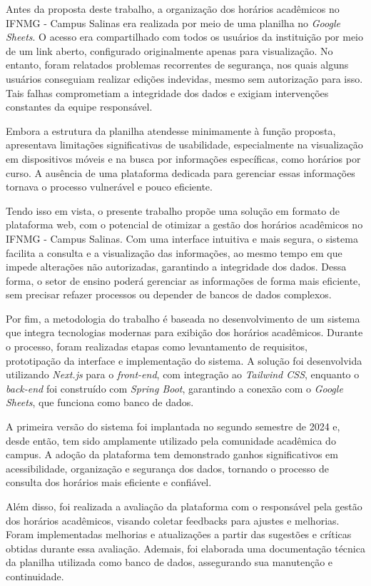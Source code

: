 Antes da proposta deste trabalho, a organização dos horários acadêmicos no IFNMG - Campus Salinas era realizada por meio de uma planilha no \textit{Google Sheets}. O acesso era compartilhado com todos os usuários da instituição por meio de um link aberto, configurado originalmente apenas para visualização. No entanto, foram relatados problemas recorrentes de segurança, nos quais alguns usuários conseguiam realizar edições indevidas, mesmo sem autorização para isso. Tais falhas comprometiam a integridade dos dados e exigiam intervenções constantes da equipe responsável.

Embora a estrutura da planilha atendesse minimamente à função proposta, apresentava limitações significativas de usabilidade, especialmente na visualização em dispositivos móveis e na busca por informações específicas, como horários por curso. A ausência de uma plataforma dedicada para gerenciar essas informações tornava o processo vulnerável e pouco eficiente.

Tendo isso em vista, o presente trabalho propõe uma solução em formato de plataforma web, com o potencial de otimizar a gestão dos horários acadêmicos no IFNMG - Campus Salinas. Com uma interface intuitiva e mais segura, o sistema facilita a consulta e a visualização das informações, ao mesmo tempo em que impede alterações não autorizadas, garantindo a integridade dos dados. Dessa forma, o setor de ensino poderá gerenciar as informações de forma mais eficiente, sem precisar refazer processos ou depender de bancos de dados complexos.

Por fim, a metodologia do trabalho é baseada no desenvolvimento de um sistema que integra tecnologias modernas para exibição dos horários acadêmicos. Durante o processo, foram realizadas etapas como levantamento de requisitos, prototipação da interface e implementação do sistema. A solução foi desenvolvida utilizando \textit{Next.js} para o \textit{front-end}, com integração ao \textit{Tailwind CSS}, enquanto o \textit{back-end} foi construído com \textit{Spring Boot}, garantindo a conexão com o \textit{Google Sheets}, que funciona como banco de dados.

A primeira versão do sistema foi implantada no segundo semestre de 2024 e, desde então, tem sido amplamente utilizado pela comunidade acadêmica do campus. A adoção da plataforma tem demonstrado ganhos significativos em acessibilidade, organização e segurança dos dados, tornando o processo de consulta dos horários mais eficiente e confiável.

Além disso, foi realizada a avaliação da plataforma com o responsável pela gestão dos horários acadêmicos, visando coletar feedbacks para ajustes e melhorias. Foram implementadas melhorias e atualizações a partir das sugestões e críticas obtidas durante essa avaliação. Ademais, foi elaborada uma documentação técnica da planilha utilizada como banco de dados, assegurando sua manutenção e continuidade.

